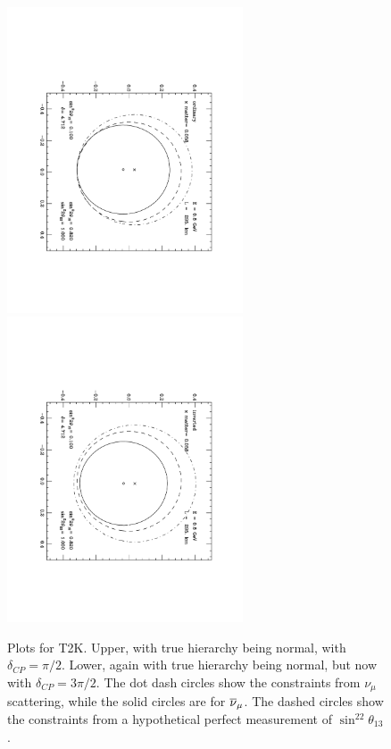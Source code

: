 \begin{figure}
\begin{center}
\includegraphics[width=2.75in,angle=90]{RNC/cpv_t2k_threepibytwo.pdf}
\includegraphics[width=2.75in,angle=90]{RNC/cpv_t2k_threepibytwo_inv.pdf}
\caption{ Plots for T2K.  Upper, with true hierarchy being normal, with $\delta_{CP}=\pi/2$.  Lower, again with true hierarchy being normal, but now with $\delta_{CP}=3\pi/2$. The dot dash circles show the constraints from $\nu_\mu$ scattering, while the solid circles are for $\overline\nu_\mu$.  The dashed circles show the constraints from a hypothetical perfect measurement of $\sin^22\theta_{13}$.\label{fig_four}}
\end{center}\end{figure}

\subsubsection{\NOvA}


